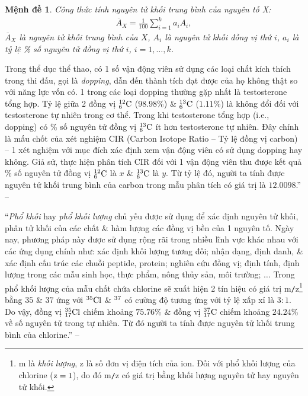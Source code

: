 \documentclass[oneside]{book}
\numberwithin{equation}{section}
\newtheorem{menhde}{Mệnh đề}[section]
\begin{document}
\begin{menhde}
	Công thức tính nguyên tử khối trung bình của nguyên tố X:
	\begin{align*}
		\overline{A}_X = \frac{1}{100}\sum_{i=1}^k a_iA_i,
	\end{align*}
	$\overline{A}_X$ là nguyên tử khối trung bình của $X$, $A_i$ là nguyên tử khối đồng vị thứ $i$, $a_i$ là tỷ lệ \% số nguyên tử đồng vị thứ $i$, $i = 1,\ldots,k$.
\end{menhde}
Trong thể dục thể thao, có 1 số vận động viên sử dụng các loại chất kích thích trong thi đấu, gọi là \textit{dopping}, dẫn đến thành tích đạt được của họ không thật so với năng lực vốn có. 1 trong các loại dopping thường gặp nhất là testosterone tổng hợp. Tỷ lệ giữa 2 đồng vị $\rm{}_6^{12}C$ ($98.98$\%) \& $\rm{}_6^{13}C$ ($1.11$\%) là không đổi đối với testosterone tự nhiên trong cơ thể. Trong khi testosterone tổng hợp (i.e., dopping) có \% số nguyên tử đồng vị $\rm{}_6^{13}C$ ít hơn testosterone tự nhiên. Đây chính là mấu chốt của xét nghiệm CIR (Carbon Isotope Ratio -- Tỷ lệ đồng vị carbon) -- 1 xét nghiệm với mục đích xác định xem vận động viên có sử dụng dopping hay không. Giả sử, thực hiện phân tích CIR đối với 1 vận động viên thu được kết quả \% số nguyên tử đồng vị $\rm{}_6^{12}C$ là $x$ \& $\rm{}_6^{13}C$ là $y$. Từ tỷ lệ đó, người ta tính được nguyên tử khối trung bình của carbon trong mẫu phân tích có giá trị là $12.0098$.'' -- \cite[p. 24]{SGK_Hoa_Hoc_10_Chan_Troi_Sang_Tao}

``\textit{Phổ khối} hay \textit{phổ khối lượng} chủ yếu được sử dụng để xác định nguyên tử khối, phân tử khối của các chất \& hàm lượng các đồng vị bền của 1 nguyên tố. Ngày nay, phương pháp này được sử dụng rộng rãi trong nhiều lĩnh vực khác nhau với các ứng dụng chính như: xác định khối lượng tương đối; nhận dạng, định danh, \& xác định cấu trúc các chuỗi peptide, protein; nghiên cứu đồng vị; định tính, định lượng trong các mẫu sinh học, thực phẩm, nông thủy sản, môi trường; $\ldots$ Trong phổ khối lượng của mẫu chất chứa chlorine sẽ xuất hiện 2 tín hiệu có giá trị m\texttt{/}z\footnote{m là \textit{khối lượng}, z là số đơn vị điện tích của ion. Đối với phổ khối lượng của chlorine ($\rm z = 1$), do đó m\texttt{/}z có giá trị bằng khối lượng nguyên tử hay nguyên tử khối.} bằng $35$ \& $37$ ứng với $\rm{}^{35}Cl$ \& $\rm{}^{37}$ có cường độ tương ứng với tỷ lệ xấp xỉ là $3:1$. Do vậy, đồng vị $\rm{}_{17}^{35}Cl$ chiếm khoảng $75.76$\% \& đồng vị $\rm{}_{17}^{37}C$ chiếm khoảng $24.24$\% về số nguyên tử trong tự nhiên. Từ đó người ta tính được nguyên tử khối trung bình của chlorine.'' -- \cite[p. 24]{SGK_Hoa_Hoc_10_Chan_Troi_Sang_Tao}
\end{document}
